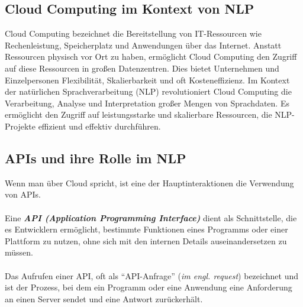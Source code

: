 \documentclass[12pt,a4paper]{article}
\begin{document}
\subsection{Cloud Computing im Kontext von NLP}
Cloud Computing bezeichnet die Bereitstellung von IT-Ressourcen wie Rechenleistung, Speicherplatz und Anwendungen über das Internet. Anstatt Ressourcen physisch vor Ort zu haben, ermöglicht Cloud Computing den Zugriff auf diese Ressourcen in großen Datenzentren. Dies bietet Unternehmen und Einzelpersonen Flexibilität, Skalierbarkeit und oft Kosteneffizienz. Im Kontext der natürlichen Sprachverarbeitung (NLP) revolutioniert Cloud Computing die Verarbeitung, Analyse und Interpretation großer Mengen von Sprachdaten. Es ermöglicht den Zugriff auf leistungsstarke und skalierbare Ressourcen, die NLP-Projekte effizient und effektiv durchführen.
\subsection{APIs und ihre Rolle im NLP}
Wenn man über Cloud spricht, ist eine der Hauptinteraktionen die Verwendung von APIs. 
\\ \\
Eine \textbf{\textit{API (Application Programming Interface)}} dient als Schnittstelle, die es Entwicklern ermöglicht, bestimmte Funktionen eines Programms oder einer Plattform zu nutzen, ohne sich mit den internen Details auseinandersetzen zu müssen. 
\\ \\
Das Aufrufen einer API, oft als \enquote{API-Anfrage} (\textit{im engl. request})  bezeichnet und ist der Prozess, bei dem ein Programm oder eine Anwendung eine Anforderung an einen Server sendet und eine Antwort zurückerhält.
\end{document}
